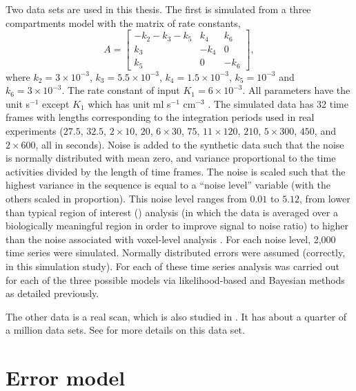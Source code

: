 Two data sets are used in this thesis. The first is simulated from a
three compartments model with the matrix of rate constants,
\begin{equation}
  A = \begin{bmatrix}
    - k_2 - k_3 - k_5 & k_4  & k_6 \\
    k_3               & -k_4 & 0   \\
    k_5               & 0    & -k_6
  \end{bmatrix},
\end{equation}
where $k_2 = 3 \times 10^{-3}$, $k_3 = 5.5 \times 10^{-3}$, $k_4 = 1.5 \times
10^{-3}$, $k_5 = 10^{-3}$ and $k_6 = 3 \times 10^{-3}$. The rate constant of
input $K_1 = 6\times 10^{-3}$. All parameters have the unit s$^{-1}$ except
$K_1$ which has unit ml s$^{-1}$ cm$^{-3}$ \cite{RLNomen}. The simulated data
has 32 time frames with lengths corresponding to the integration periods used
in real experiments ($27.5$, $32.5$, $2 \times 10$, $20$, $6 \times 30$, $75$,
$11 \times 120$, $210$, $5 \times 300$, $450$, and $2 \times 600$, all in
seconds).  Noise is added to the synthetic data such that the noise is
normally distributed with mean zero, and variance proportional to the time
activities divided by the length of time frames. The noise is scaled such that
the highest variance in the sequence is equal to a ``noise level'' variable
(with the others scaled in proportion).  This noise level ranges from $0.01$
to $5.12$, from lower than typical region of interest (\roi) analysis (in
which the data is averaged over a biologically meaningful region in order to
improve signal to noise ratio) to higher than the noise associated with
voxel-level analysis \citep{Peng:2008fx}.  For each noise level, 2,000 time
series were simulated.  Normally distributed errors were assumed (correctly,
in this simulation study). For each of these time series analysis was carried
out for each of the three possible models via likelihood-based and Bayesian
methods as detailed previously.

The other data is a real \pet scan, which is also studied in
\cite{Peng:2008fx}.  It has about a quarter of a million data sets. See
\cite{Zhou2013} for more details on this data set.

\section{Error model}
\label{sec:Error model}

